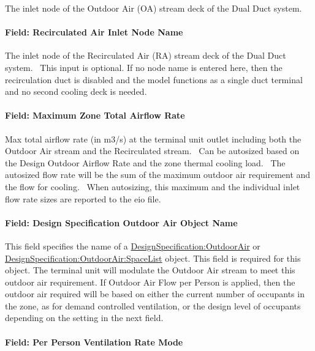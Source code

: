 The inlet node of the Outdoor Air (OA) stream deck of the Dual Duct system.

\paragraph{Field: Recirculated Air Inlet Node Name}\label{field-recirculated-air-inlet-node-name}

The inlet node of the Recirculated Air (RA) stream deck of the Dual Duct system. ~This input is optional. If no node name is entered here, then the recirculation duct is disabled and the model functions as a single duct terminal and no second cooling deck is needed.

\paragraph{Field: Maximum Zone Total Airflow Rate}\label{field-maximum-zone-total-airflow-rate}

Max total airflow rate (in m3/s) at the terminal unit outlet including both the Outdoor Air stream and the Recirculated stream.~ Can be autosized based on the Design Outdoor Airflow Rate and the zone thermal cooling load.~ The autosized flow rate will be the sum of the maximum outdoor air requirement and the flow for cooling. ~When autosizing, this maximum and the individual inlet flow rate sizes are reported to the eio file.

\paragraph{Field: Design Specification Outdoor Air Object Name}\label{field-design-specification-outdoor-air-object-name-3}

This field specifies the name of a \hyperref[designspecificationoutdoorair]{DesignSpecification:OutdoorAir} or \hyperref[designspecificationoutdoorairspacelist]{DesignSpecification:OutdoorAir:SpaceList} object. This field is required for this object. The terminal unit will modulate the Outdoor Air stream to meet this outdoor air requirement. If Outdoor Air Flow per Person is applied, then the outdoor air required will be based on either the current number of occupants in the zone, as for demand controlled ventilation, or the design level of occupants depending on the setting in the next field.

\paragraph{Field: Per Person Ventilation Rate Mode}

